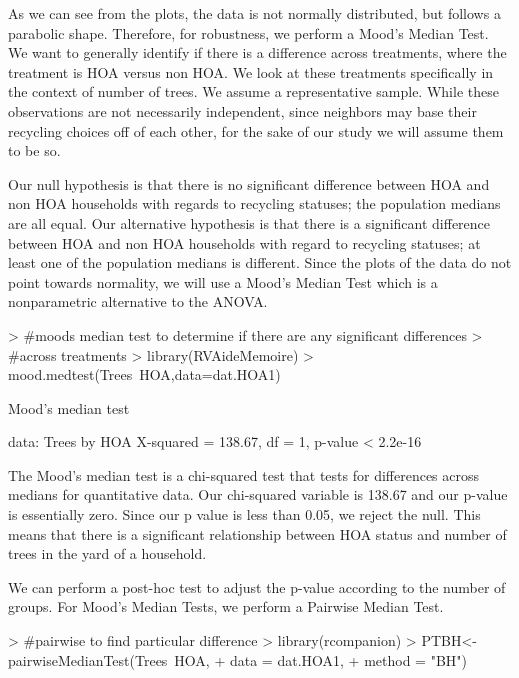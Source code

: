 \documentclass{article}
\begin{document}
As we can see from the plots\citep{qqplotr}, the data is not normally distributed, but follows a parabolic shape. Therefore, for robustness, we perform a Mood's Median Test\citep{RVAideMemoire}. We want to generally identify if there is a difference across treatments, where the treatment is HOA versus non HOA. We look at these treatments specifically in the context of number of trees. We assume a representative sample. While these observations are not necessarily independent, since neighbors may base their recycling choices off of each other, for the sake of our study we will assume them to be so.

Our null hypothesis is that there is no significant difference between HOA and non HOA households with regards to recycling statuses; the population medians are all equal. Our alternative hypothesis is that there is a significant difference between HOA and non HOA households with regard to recycling statuses; at least one of the population medians is different. Since the plots of the data do not point towards normality, we will use a Mood's Median Test which is a nonparametric alternative to the ANOVA.

\begin{Schunk}
\begin{Sinput}
> #moods median test to determine if there are any significant differences
> #across treatments
> library(RVAideMemoire)
> mood.medtest(Trees~HOA,data=dat.HOA1)
\end{Sinput}
\begin{Soutput}
	Mood's median test

data:  Trees by HOA
X-squared = 138.67, df = 1, p-value < 2.2e-16
\end{Soutput}
\end{Schunk}

The Mood's median test is a chi-squared test that tests for differences across medians for quantitative data. Our chi-squared variable is 138.67 and our p-value is essentially zero. Since our p value is less than 0.05, we reject the null. This means that there is a significant relationship between HOA status and number of trees in the yard of a household.

We can perform a post-hoc test to adjust the p-value according to the number of groups. For Mood's Median Tests, we perform a Pairwise Median Test. 

\begin{Schunk}
\begin{Sinput}
> #pairwise to find particular difference
> library(rcompanion)
> PTBH<-pairwiseMedianTest(Trees~HOA,
+                        data   = dat.HOA1,
+                        method = "BH")
\end{Sinput}
\end{Schunk}
\end{document}
